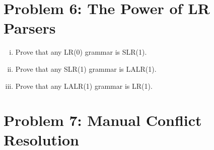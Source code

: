 \documentclass{article}
\begin{document}
\section{Problem 6: The Power of LR Parsers}

\begin{enumerate}[i.]
	\item Prove that any LR(0) grammar is SLR(1).


	\item Prove that any SLR(1) grammar is LALR(1).


	\item Prove that any LALR(1) grammar is LR(1).

\end{enumerate}

\section{Problem 7: Manual Conflict Resolution}
\end{document}
